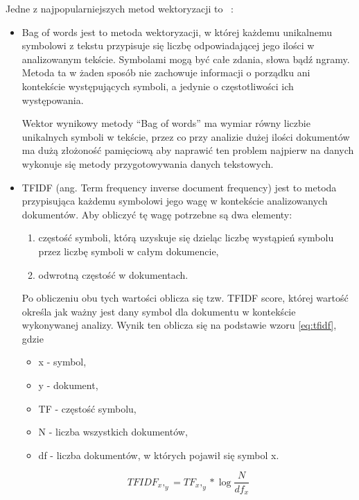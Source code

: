 Jedne z najpopularniejszych metod wektoryzacji to ~\cite{ML}: 
\begin{itemize}
    \item Bag of words jest to metoda wektoryzacji, w której każdemu unikalnemu symbolowi z tekstu przypisuje się liczbę 
    odpowiadającej jego ilości w analizowanym tekście. Symbolami mogą być całe zdania, słowa bądź ngramy. 
    Metoda ta w żaden sposób nie zachowuje informacji o porządku ani kontekście występujących symboli, a jedynie o 
    częstotliwości ich występowania. 
    
    Wektor wynikowy metody ``Bag of words'' ma wymiar równy liczbie unikalnych symboli w tekście, przez co przy analizie dużej ilości 
    dokumentów ma dużą złożoność pamięciową aby naprawić ten problem najpierw na danych wykonuje się metody przygotowywania danych tekstowych.

    \item TFIDF (ang. Term frequency inverse document frequency) jest to metoda przypisująca każdemu symbolowi 
    jego wagę w kontekście analizowanych dokumentów. Aby obliczyć tę wagę potrzebne są dwa elementy:
    \begin{enumerate}
        \item częstość symboli, którą uzyskuje się dzieląc liczbę wystąpień symbolu przez liczbę symboli w całym dokumencie,
        \item odwrotną częstość w dokumentach.
    \end{enumerate}
    Po obliczeniu obu tych wartości oblicza się tzw. TFIDF score, której wartość określa jak ważny jest dany symbol 
    dla dokumentu w kontekście wykonywanej analizy. Wynik ten oblicza się na podstawie wzoru \ref{eq:tfidf}, gdzie
    \begin{itemize}
        \item x - symbol,
        \item y - dokument,
        \item TF - częstość symbolu,
        \item N - liczba wszystkich dokumentów,
        \item df - liczba dokumentów, w których pojawił się symbol x.
    \end{itemize}

    \begin{equation}
        \label{eq:tfidf}
        TFIDF_x,_y = TF_x,_y* \log{\frac{N}{df_x}}
    \end{equation}
\end{itemize}